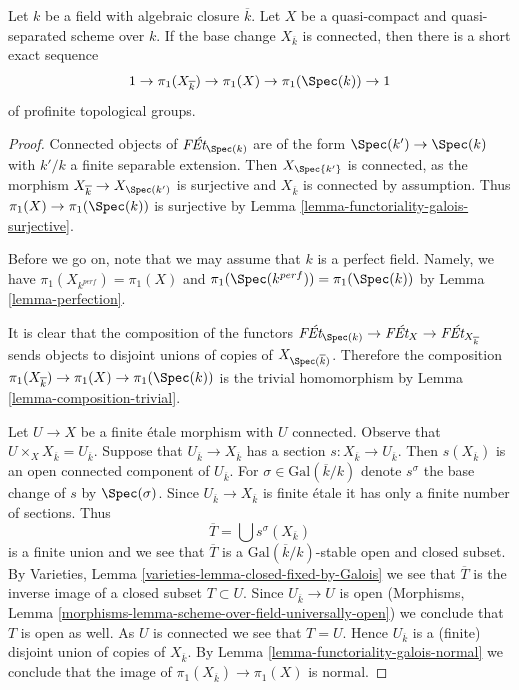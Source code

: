 \begin{lemma}
\label{lemma-ses-field}
Let $k$ be a field with algebraic closure $\overline{k}$.
Let $X$ be a quasi-compact and quasi-separated scheme over $k$.
If the base change $X_{\overline{k}}$ is connected, then
there is a short exact sequence
$$
1 \to \pi_1(X_{\overline{k}}) \to \pi_1(X) \to \pi_1(\Spec(k)) \to 1
$$
of profinite topological groups.
\end{lemma}

\begin{proof}
Connected objects of $\textit{F\'Et}_{\Spec(k)}$ are of the form
$\Spec(k') \to \Spec(k)$ with $k'/k$ a finite separable extension.
Then $X_{\Spec{k'}}$ is connected, as the morphism
$X_{\overline{k}} \to X_{\Spec(k')}$ is surjective and
$X_{\overline{k}}$ is connected by assumption. Thus
$\pi_1(X) \to \pi_1(\Spec(k))$ is surjective by
Lemma \ref{lemma-functoriality-galois-surjective}.

\medskip\noindent
Before we go on, note that we may assume that $k$ is a perfect field.
Namely, we have $\pi_1(X_{k^{perf}}) = \pi_1(X)$ and
$\pi_1(\Spec(k^{perf})) = \pi_1(\Spec(k))$ by Lemma \ref{lemma-perfection}.

\medskip\noindent
It is clear that the composition of the functors
$\textit{F\'Et}_{\Spec(k)} \to \textit{F\'Et}_X \to
\textit{F\'Et}_{X_{\overline{k}}}$ sends objects to disjoint unions
of copies of $X_{\Spec(\overline{k})}$. Therefore the composition
$\pi_1(X_{\overline{k}}) \to \pi_1(X) \to \pi_1(\Spec(k))$
is the trivial homomorphism by Lemma \ref{lemma-composition-trivial}.

\medskip\noindent
Let $U \to X$ be a finite \'etale morphism with $U$ connected.
Observe that $U \times_X X_{\overline{k}} = U_{\overline{k}}$.
Suppose that $U_{\overline{k}} \to X_{\overline{k}}$
has a section $s : X_{\overline{k}} \to U_{\overline{k}}$.
Then $s(X_{\overline{k}})$ is an open connected component of
$U_{\overline{k}}$. For $\sigma \in \text{Gal}(\overline{k}/k)$
denote $s^\sigma$ the base change of $s$ by $\Spec(\sigma)$.
Since $U_{\overline{k}} \to X_{\overline{k}}$ is finite \'etale
it has only a finite number of sections. Thus
$$
\overline{T} = \bigcup s^\sigma(X_{\overline{k}})
$$
is a finite union and we see that $\overline{T}$ is a
$\text{Gal}(\overline{k}/k)$-stable open and closed subset.
By Varieties, Lemma \ref{varieties-lemma-closed-fixed-by-Galois}
we see that $\overline{T}$ is the inverse image of a closed
subset $T \subset U$. Since $U_{\overline{k}} \to U$ is open
(Morphisms, Lemma \ref{morphisms-lemma-scheme-over-field-universally-open})
we conclude that $T$ is open as well. As $U$ is connected we
see that $T = U$. Hence $U_{\overline{k}}$ is a (finite) disjoint
union of copies of $X_{\overline{k}}$. By
Lemma \ref{lemma-functoriality-galois-normal} we conclude that the image of
$\pi_1(X_{\overline{k}}) \to \pi_1(X)$ is normal.


\end{proof}
